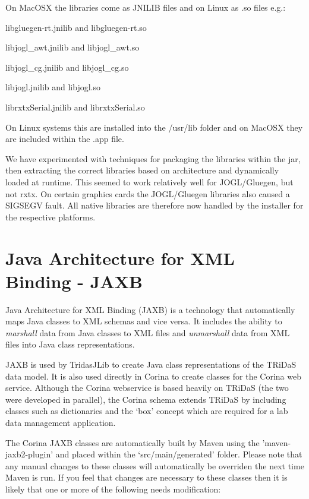 On MacOSX the libraries come as JNILIB files and on Linux as .so files e.g.:

\begin{itemize*}
 \item libgluegen-rt.jnilib and libgluegen-rt.so
 \item libjogl\_awt.jnilib and libjogl\_awt.so
 \item libjogl\_cg.jnilib and libjogl\_cg.so
 \item libjogl.jnilib and libjogl.so
 \item librxtxSerial.jnilib and librxtxSerial.so
\end{itemize*}

On Linux systems this are installed into the /usr/lib folder and on MacOSX they are included within the .app file.

We have experimented with techniques for packaging the libraries within the jar, then extracting the correct libraries based on architecture and dynamically loaded at runtime.  This seemed to work relatively well for JOGL/Gluegen, but not rxtx.  On certain graphics cards the JOGL/Gluegen libraries also caused a SIGSEGV fault.  All native libraries are therefore now handled by the installer for the respective platforms.  


\section{Java Architecture for XML Binding - JAXB}
\label{txt:jaxb}

Java Architecture for XML Binding (JAXB) is a technology that automatically maps Java classes to XML schemas and vice versa.  It includes the ability to \emph{marshall} data from Java classes to XML files and \emph{unmarshall} data from XML files into Java class representations.  

JAXB is used by TridasJLib to create Java class representations of the TRiDaS data model.  It is also used directly in Corina to create classes for the Corina web service.  Although the Corina webservice is based heavily on TRiDaS (the two were developed in parallel), the Corina schema extends TRiDaS by including classes such as dictionaries and the `box' concept which are required for a lab data management application.  

The Corina JAXB classes are automatically built by Maven using the 'maven-jaxb2-plugin' and placed within the `src/main/generated' folder.  Please note that any manual changes to these classes will automatically be overriden the next time Maven is run.  If you feel that changes are necessary to these classes then it is likely that one or more of the following needs modification:

